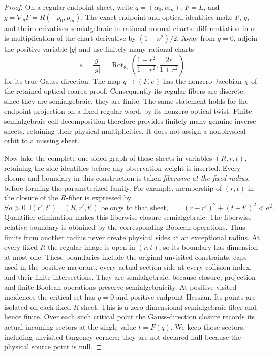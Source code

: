 \begin{proof}
On a regular endpoint sheet, write
$q=(\alpha_0,\alpha_m)$, $F=L$, and
$g=\nabla_qF=R(-p_0,p_m)$. The exact endpoint and optical
identities make $F$, $g$, and their derivatives semialgebraic in
rational normal charts: differentiation in $\alpha$ is
multiplication of the chart derivative by $(1+x^2)/2$.
Away from $g=0$, adjoin the positive variable $|g|$ and use
finitely many rational charts
\[
        e=\frac g{|g|}
           =\operatorname{Rot}_{\theta_*}
             \left(\frac{1-r^2}{1+r^2},
                         \frac{2r}{1+r^2}\right)
\]
for its true Gauss direction. The map $q\mapsto(F,e)$ has
the nonzero Jacobian $\chi$ of the retained optical coarea proof.
Consequently its regular fibers are discrete; since they are
semialgebraic, they are finite. The same statement holds for
the endpoint projection on a fixed regular word, by its nonzero
optical twist. Finite semialgebraic cell decomposition therefore
provides finitely many genuine inverse sheets, retaining their
physical multiplicities. It does not assign a nonphysical orbit
to a missing sheet.

Now take the complete one-sided graph of these sheets in variables
$(R,r,t)$, retaining the side identities before any observation
weight is inserted. Every closure and boundary in this construction
is taken \emph{fiberwise at the fixed radius}, before forming the
parameterized family. For example, membership of $(r,t)$ in the
closure of the $R$-fiber is expressed by
\[
 \forall a>0\ \exists(r',t')\quad
 (R,r',t')\text{ belongs to that sheet},\qquad
 (r-r')^2+(t-t')^2<a^2.
\]
Quantifier elimination makes this fiberwise closure semialgebraic.
The fiberwise relative boundary is obtained by the corresponding
Boolean operations. Thus limits from another radius never create
physical sides at an exceptional radius. At every fixed $R$ the
regular image is open in $(r,t)$, so its boundary has dimension at
most one. These boundaries include the original unvisited
constraints, caps used in the positive majorant, every actual
section side at every collision index, and their finite
intersections. They are semialgebraic, because closure, projection
and finite Boolean operations preserve semialgebraicity.
At positive visited incidences the critical set has
$g=0$ and positive endpoint Hessian. Its points are isolated on
each fixed-$R$ sheet. This is a zero-dimensional semialgebraic
fiber and hence finite. Over each such critical point the
Gauss-direction closure records its actual incoming sectors at
the single value $t=F(q)$. We keep those sectors, including
unvisited-tangency corners; they are not declared null because
the physical source point is null.


\end{proof}
